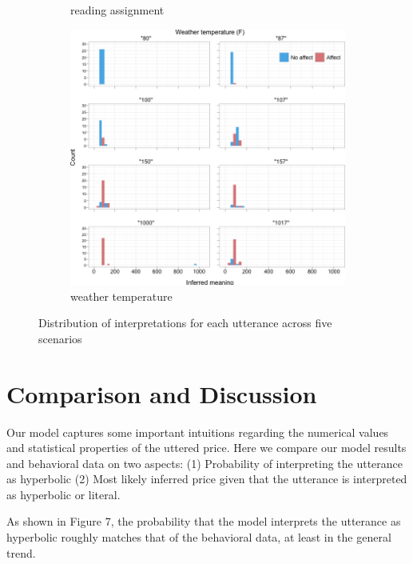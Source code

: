 \documentclass{article} %
\begin{document}
\begin{figure}[t]
\begin{subfigure}[b]{0.33\textwidth}
		\caption{reading assignment}
	\end{subfigure}
	\begin{subfigure}[b]{0.33\textwidth}
                \centering
                \includegraphics[width=\textwidth]{humans_all_weather.png}
		\caption{weather temperature}
	\end{subfigure}
	\caption{Distribution of interpretations for each utterance across five scenarios}
\end{figure}


\section{Comparison and Discussion}
Our model captures some important intuitions regarding the numerical values and statistical properties of the uttered price. Here we compare our model results and behavioral data on two aspects: (1) Probability of interpreting the utterance as hyperbolic (2) Most likely inferred price given that the utterance is interpreted as hyperbolic or literal.


As shown in Figure 7, the probability that the model interprets the utterance as hyperbolic roughly matches that of the behavioral data, at least in the general trend. 
\end{document}
